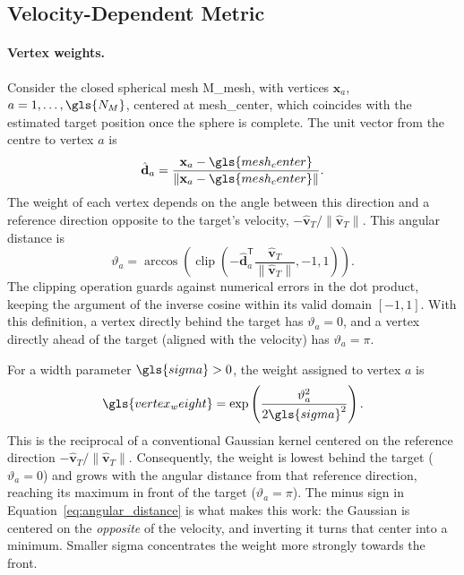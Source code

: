 \subsection{Velocity-Dependent Metric}

\paragraph{Vertex weights.}
Consider the closed spherical mesh \gls{M_mesh}, with vertices $\mathbf{x}_a$, $a=1,\dots,\gls{N_M}$, centered at \gls{mesh_center}, which coincides with the estimated target position once the sphere is complete. The unit vector from the centre to vertex $a$ is
\begin{equation}
    \hat{\mathbf{d}}_a = \frac{\mathbf{x}_a - \gls{mesh_center}}{\|\mathbf{x}_a - \gls{mesh_center}\|}.
    \label{eq:relative_mesh_vector}
\end{equation}
The weight of each vertex depends on the angle between this direction and a reference direction opposite to the target's velocity, $-\hat{\mathbf{v}}_T/\|\hat{\mathbf{v}}_T\|$. This angular distance is
\begin{equation}
    \vartheta_a
    =
    \arccos\left(
        \operatorname{clip}
        \left(
            - \hat{\mathbf{d}}_a^{\mathsf{T}}
            \frac{\hat{\mathbf{v}}_T}{\|\hat{\mathbf{v}}_T\|},
            -1,1
        \right)
    \right).
    \label{eq:angular_distance}
\end{equation}
The clipping operation guards against numerical errors in the dot product, keeping the argument of the inverse cosine within its valid domain $[-1,1]$. With this definition, a vertex directly behind the target has $\vartheta_a=0$, and a vertex directly ahead of the target (aligned with the velocity) has $\vartheta_a=\pi$.

For a width parameter $\gls{sigma}>0$, the weight assigned to vertex $a$ is
\begin{equation}
    \gls{vertex_weight} =
    \exp\left(
        \frac{\vartheta_a^2}{2\gls{sigma}^2}
    \right).
    \label{eq.6:spherical_gaussian_weight}
\end{equation}
This is the reciprocal of a conventional Gaussian kernel centered on the reference direction $-\hat{\mathbf{v}}_T/\|\hat{\mathbf{v}}_T\|$. Consequently, the weight is lowest behind the target ($\vartheta_a=0$) and grows with the angular distance from that reference direction, reaching its maximum in front of the target ($\vartheta_a=\pi$). The minus sign in Equation~\eqref{eq:angular_distance} is what makes this work: the Gaussian is centered on the \emph{opposite} of the velocity, and inverting it turns that center into a minimum. Smaller \gls{sigma} concentrates the weight more strongly towards the front.

